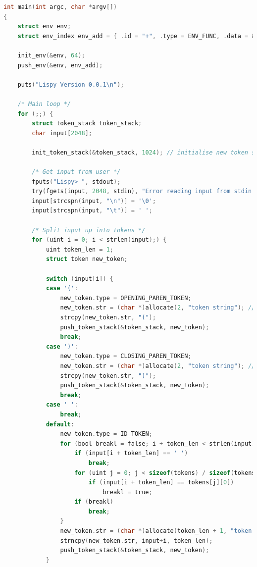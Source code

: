 \documentclass[11pt]{article}
\begin{document}
\begin{lstlisting}[language=C, basicstyle=\tiny]
int main(int argc, char *argv[])
{
    struct env env;
    struct env_index env_add = { .id = "+", .type = ENV_FUNC, .data = &add };

    init_env(&env, 64);
    push_env(&env, env_add);

    puts("Lispy Version 0.0.1\n");

    /* Main loop */
    for (;;) {
        struct token_stack token_stack;
        char input[2048];

        init_token_stack(&token_stack, 1024); // initialise new token stack

        /* Get input from user */
        fputs("Lispy> ", stdout);
        try(fgets(input, 2048, stdin), "Error reading input from stdin: %s.\n", strerror(errno));
        input[strcspn(input, "\n")] = '\0';
        input[strcspn(input, "\t")] = ' ';

        /* Split input up into tokens */
        for (uint i = 0; i < strlen(input);) {
            uint token_len = 1;
            struct token new_token;

            switch (input[i]) {
            case '(':
                new_token.type = OPENING_PAREN_TOKEN;
                new_token.str = (char *)allocate(2, "token string"); // two including null byte
                strcpy(new_token.str, "(");
                push_token_stack(&token_stack, new_token);
                break;
            case ')':
                new_token.type = CLOSING_PAREN_TOKEN;
                new_token.str = (char *)allocate(2, "token string"); // two including null byte
                strcpy(new_token.str, ")");
                push_token_stack(&token_stack, new_token);
                break;
            case ' ':
                break;
            default:
                new_token.type = ID_TOKEN;
                for (bool breakl = false; i + token_len < strlen(input) && !breakl; token_len++) {
                    if (input[i + token_len] == ' ')
                        break;
                    for (uint j = 0; j < sizeof(tokens) / sizeof(tokens[0]) && !breakl; j++)
                        if (input[i + token_len] == tokens[j][0])
                            breakl = true;
                    if (breakl)
                        break;
                }
                new_token.str = (char *)allocate(token_len + 1, "token string");
                strncpy(new_token.str, input+i, token_len);
                push_token_stack(&token_stack, new_token);
            }


\end{lstlisting}
\end{document}
